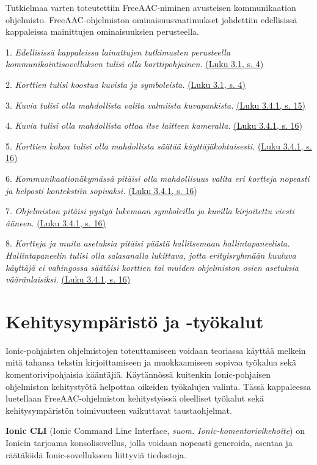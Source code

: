 \documentclass[utf8]{gradu3}
\begin{document}
Tutkielmaa varten toteutettiin FreeAAC-niminen avusteisen kommunikaation ohjelmisto. FreeAAC-ohjelmiston ominaisuusvaatimukset johdettiin edellisissä kappaleissa mainittujen ominaisuuksien perusteella.

1. \textit{Edellisissä kappaleissa lainattujen tutkimusten perusteella kommunikointisovelluksen tulisi olla korttipohjainen.} \hyperref[AAC-cards]{(Luku 3.1, s. 4)}

2. \textit{Korttien tulisi koostua kuvista ja symboleista.} \hyperref[AAC-symbols]{(Luku 3.1, s. 4)}

3. \textit{Kuvia tulisi olla mahdollista valita valmiista kuvapankista.} \hyperref[symbol-libraries]{(Luku 3.4.1, s. 15)}

4. \textit{Kuvia tulisi olla mahdollista ottaa itse laitteen kameralla.} \hyperref[AAC-photos]{(Luku 3.4.1, s. 16)}

5. \textit{Korttien kokoa tulisi olla mahdollista säätää käyttäjäkohtaisesti.} \hyperref[AAC-cardsize]{(Luku 3.4.1, s. 16)}

6. \textit{Kommunikaationäkymässä pitäisi olla mahdollisuus valita eri kortteja nopeasti ja helposti kontekstiin sopivaksi.} \hyperref[AAC-cardsize]{(Luku 3.4.1, s. 16)}

7. \textit{Ohjelmiston pitäisi pystyä lukemaan symboleilla ja kuvilla kirjoitettu viesti ääneen.} \hyperref[AAC-soundsynth]{(Luku 3.4.1, s. 16)}

8. \textit{Kortteja ja muita asetuksia pitäisi päästä hallitsemaan hallintapaneelista. Hallintapaneelin tulisi olla salasanalla lukittava, jotta erityisryhmään kuuluva käyttäjä ei vahingossa säätäisi korttien tai muiden ohjelmiston osien asetuksia vääränlaisiksi.} \hyperref[AAC-settings]{(Luku 3.4.1, s. 16)}

\section{Kehitysympäristö ja -työkalut}

Ionic-pohjaisten ohjelmistojen toteuttamiseen voidaan teoriassa käyttää melkein mitä tahansa tekstin kirjoittamiseen ja muokkaamiseen sopivaa työkalua sekä komentorivipohjaisia kääntäjiä. Käytännössä kuitenkin Ionic-pohjaisen ohjelmiston kehitystyötä helpottaa oikeiden työkalujen valinta. Tässä kappaleessa luetellaan FreeAAC-ohjelmiston kehitystyössä oleelliset työkalut sekä kehitysympäristön toimivuuteen vaikuttavat taustaohjelmat.

\textbf{Ionic CLI} (Ionic Command Line Interface, \textit{suom. Ionic-komentorivikehoite}) on Ionicin tarjoama konsolisovellus, jolla voidaan nopeasti generoida, asentaa ja räätälöidä Ionic-sovellukseen liittyviä tiedostoja.
\end{document}
